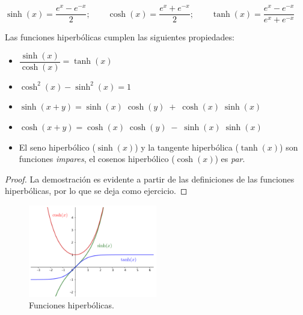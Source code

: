 		$\sinh (x)= \dfrac {e^x-e^{-x}}{2}; \qquad \cosh (x)= \dfrac {e^x+e^{-x}}{2}; \qquad \tanh (x)= \dfrac {e^x-e^{-x}}{e^x+e^{-x}}$
		
		\begin{prop} Las funciones hiperbólicas cumplen las siguientes propiedades:
		
		\begin{itemize}
			\item $\dfrac {\sinh (x)}{\cosh (x)}= \tanh (x)$
			\item $\cosh^2(x)-\sinh^2(x)=1 $
			\item $\sinh(x+y)=\sinh(x)\; \cosh (y) \; + \; \cosh(x) \; \sinh(x)$
			\item $\cosh(x+y)=\cosh(x)\; \cosh (y) \; - \; \sinh(x) \; \sinh(x)$
			\item El seno hiperbólico ($\sinh(x)$) y la tangente hiperbólica ($\tanh(x)$) son funciones \emph{impares}, el cosenos hiperbólico ($\cosh(x)$) es \emph{par}.
		\end{itemize}
			
		\end{prop}
		
		\begin{proof}
			La demostración es evidente a partir de las definiciones de las funciones hiperbólicas, por lo que se deja como ejercicio.
		\end{proof}

		\begin{figure}[H]
			\centering
			\includegraphics[width=0.5\textwidth]{imagenes/imagenes02/T02IM14.png}
			\caption{Funciones hiperbólicas.}
		\end{figure}
		
